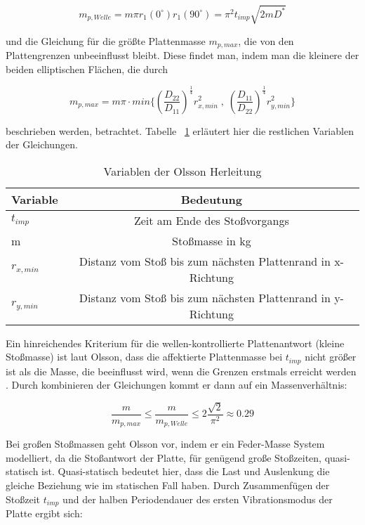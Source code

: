 \begin{equation}
	m_{p,Welle} = m \pi r_{1}(0^{\circ}) r_{1}(90^{\circ}) = \pi^{2} t_{imp} \sqrt{2mD^{*}}
\end{equation}

und die Gleichung für die größte Plattenmasse $m_{p,max}$, die von den Plattengrenzen unbeeinflusst bleibt. Diese findet man, indem man die kleinere der beiden elliptischen Flächen, die durch

\begin{equation}
	m_{p,max} = m \pi \cdot min\{(\frac{D_{22}}{D_{11}})^{\frac{1}{4}} r_{x,min}^{2} \; , \; (\frac{D_{11}}{D_{22}})^{\frac{1}{4}} r_{y,min}^{2} \}
\end{equation}		
		
beschrieben werden, betrachtet. Tabelle ~\ref{tab:Tabelle 2} erläutert hier die restlichen Variablen der Gleichungen.

\begin{table}[h!]
	\begin{center}
		\caption{Variablen der Olsson Herleitung}
		\label{tab:Tabelle 2}
		\begin{tabular}{l|c}
			\textbf{Variable} & \textbf{Bedeutung}\\
			\hline
			$t_{imp}$ & Zeit am Ende des Stoßvorgangs\\
			m & Stoßmasse in kg\\
			$r_{x,min}$ & Distanz vom Stoß bis zum nächsten Plattenrand in x-Richtung\\
			$r_{y,min}$ & Distanz vom Stoß bis zum nächsten Plattenrand in y-Richtung\\
		\end{tabular}
	\end{center}
\end{table}

Ein hinreichendes Kriterium für die wellen-kontrollierte Plattenantwort (kleine Stoßmasse) ist laut Olsson, dass die affektierte Plattenmasse bei $t_{imp}$ nicht größer ist als die Masse, die beeinflusst wird, wenn die Grenzen erstmals erreicht werden \cite{Olsson.2000}. Durch kombinieren der Gleichungen kommt er dann auf ein Massenverhältnis:

\begin{equation}
	\frac{m}{m_{p,max}} \leq \frac{m}{m_{p,Welle}} \leq 2 \frac{\sqrt{2}}{\pi^{2}} \approx 0.29
\end{equation}

Bei großen Stoßmassen geht Olsson vor, indem er ein Feder-Masse System modelliert, da die Stoßantwort der Platte, für genügend große Stoßzeiten, quasi-statisch ist. Quasi-statisch bedeutet hier, dass die Last und Auslenkung die gleiche Beziehung wie im statischen Fall haben. Durch Zusammenfügen der Stoßzeit $t_{imp}$ und der halben Periodendauer des ersten Vibrationsmodus der Platte ergibt sich: 

